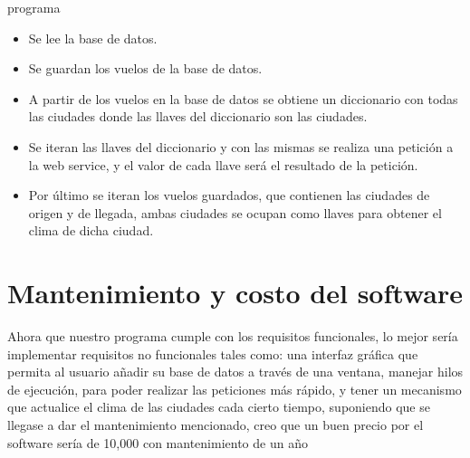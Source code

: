 \documentclass{article}
\begin{document}
programa 
\begin{itemize}
    \item Se lee la base de datos.
    \item Se guardan los vuelos de la base de datos.
    \item A partir de los vuelos en la base de datos se obtiene un diccionario con todas las ciudades donde las llaves del diccionario son las ciudades.
    \item Se iteran las llaves del diccionario y con las mismas se realiza una petición a la web service, y el valor de cada llave será el resultado de la petición.
    \item Por último se iteran los vuelos guardados, que contienen las ciudades de origen y de llegada, ambas ciudades se ocupan como llaves para obtener el clima de dicha ciudad.
\end{itemize}
\section{Mantenimiento y costo del software}
Ahora que nuestro programa cumple con los requisitos funcionales, lo mejor sería implementar requisitos no funcionales tales como: una interfaz gráfica que permita al usuario añadir su base de datos a través de una ventana, manejar hilos de ejecución, para poder realizar las peticiones más rápido, y tener un mecanismo que actualice el clima de las ciudades cada cierto tiempo, suponiendo que se llegase a dar el mantenimiento mencionado, creo que un buen precio por el software sería de 10,000 con mantenimiento de un año  
\end{document}

